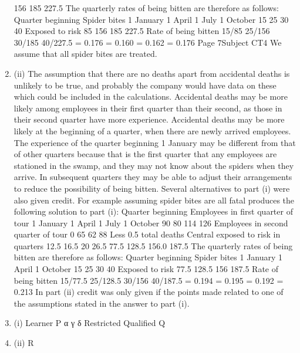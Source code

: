 \documentclass[a4paper,12pt]{article}
\begin{document}
\begin{enumerate}
156
185
227.5
The quarterly rates of being bitten are therefore as follows:
Quarter
beginning Spider bites
1 January
1 April
1 July
1 October 15
25
30
40
Exposed to
risk
85
156
185
227.5
Rate of
being bitten
15/85
25/156
30/185
40/227.5
= 0.176
= 0.160
= 0.162
= 0.176
Page 7Subject CT4 %
We assume that all spider bites are treated.
\item (ii)
The assumption that there are no deaths apart from accidental deaths is
unlikely to be true, and probably the company would have data on these
which could be included in the calculations.
Accidental deaths may be more likely among employees in their first quarter
than their second, as those in their second quarter have more experience.
Accidental deaths may be more likely at the beginning of a quarter, when
there are newly arrived employees.
The experience of the quarter beginning 1 January may be different from that
of other quarters because that is the first quarter that any employees are
stationed in the swamp, and they may not know about the spiders when they
arrive. In subsequent quarters they may be able to adjust their
arrangements to reduce the possibility of being bitten.
Several alternatives to part (i) were also given credit. For example assuming spider bites are
all fatal produces the following solution to part (i):
Quarter
beginning Employees in
first quarter
of tour
1 January
1 April
1 July
1 October 90
80
114
126
Employees in
second quarter
of tour
0
65
62
88
Less 0.5 \times
total
deaths Central
exposed
to risk in
quarters
12.5
16.5
20
26.5 77.5
128.5
156.0
187.5
The quarterly rates of being bitten are therefore as follows:
Quarter
beginning Spider bites
1 January
1 April
1 October 15
25
30
40
Exposed to
risk
77.5
128.5
156
187.5
Rate of
being bitten
15/77.5
25/128.5
30/156
40/187.5
= 0.194
= 0.195
= 0.192
= 0.213
In part (ii) credit was only given if the points made related to one of the assumptions stated in
the answer to part (i).

\item (i)
Learner
P
α
γ
δ
Restricted
Qualified
Q
\item (ii)
R
\beta


\end{enumerate}
\end{document}
